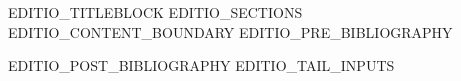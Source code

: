 \documentclass[EDITIO_CLASS_OPTIONS]{EDITIO_CLASS}
\begin{document}
EDITIO_TITLEBLOCK
EDITIO_SECTIONS
EDITIO_CONTENT_BOUNDARY
EDITIO_PRE_BIBLIOGRAPHY


EDITIO_POST_BIBLIOGRAPHY
EDITIO_TAIL_INPUTS
\end{document}
